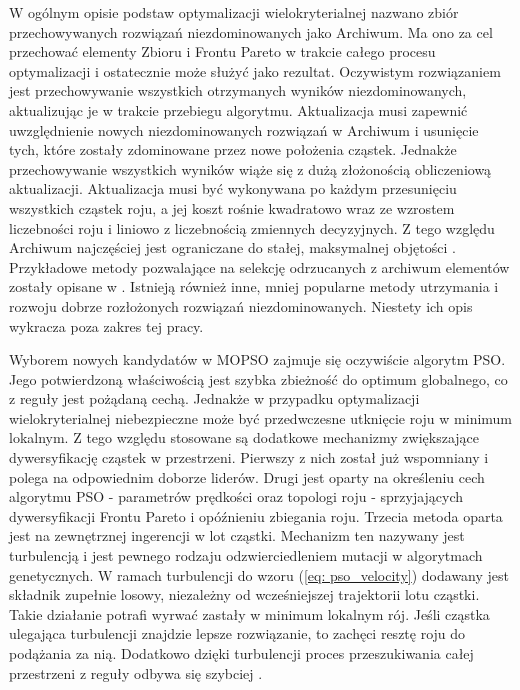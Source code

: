 W ogólnym opisie podstaw optymalizacji wielokryterialnej nazwano zbiór przechowywanych rozwiązań niezdominowanych jako Archiwum. Ma ono za cel przechować elementy Zbioru i Frontu Pareto w trakcie całego procesu optymalizacji i ostatecznie może służyć jako rezultat. Oczywistym rozwiązaniem jest przechowywanie wszystkich otrzymanych wyników niezdominowanych, aktualizując je w trakcie przebiegu algorytmu. Aktualizacja musi zapewnić uwzględnienie nowych niezdominowanych rozwiązań w Archiwum i usunięcie tych, które zostały zdominowane przez nowe położenia cząstek. Jednakże przechowywanie wszystkich wyników wiąże się z dużą złożonością obliczeniową aktualizacji. Aktualizacja musi być wykonywana po każdym przesunięciu wszystkich cząstek roju, a jej koszt rośnie kwadratowo wraz ze wzrostem liczebności roju i liniowo z liczebnością zmiennych decyzyjnych. Z tego względu Archiwum najczęściej jest ograniczane do stałej, maksymalnej objętości \parencite{Coello2007}. Przykładowe metody pozwalające na selekcję odrzucanych z archiwum elementów zostały opisane w \parencite{Zitzler1999,Knowles2000}. Istnieją również inne, mniej popularne metody utrzymania i rozwoju dobrze rozłożonych rozwiązań niezdominowanych. Niestety ich opis wykracza poza zakres tej pracy.

Wyborem nowych kandydatów w MOPSO zajmuje się oczywiście algorytm PSO. Jego potwierdzoną właściwością jest szybka zbieżność do optimum globalnego, co z reguły jest pożądaną cechą. Jednakże w przypadku optymalizacji wielokryterialnej niebezpieczne może być przedwczesne utknięcie roju w minimum lokalnym. Z tego względu stosowane są dodatkowe mechanizmy zwiększające dywersyfikację cząstek w przestrzeni. Pierwszy z nich został już wspomniany i polega na odpowiednim doborze liderów. Drugi jest oparty na określeniu cech algorytmu PSO - parametrów prędkości oraz topologi roju - sprzyjających dywersyfikacji Frontu Pareto i opóźnieniu zbiegania roju. Trzecia metoda oparta jest na zewnętrznej ingerencji w lot cząstki. Mechanizm ten nazywany jest turbulencją \parencite{Fieldsend} i jest pewnego rodzaju odzwierciedleniem mutacji w algorytmach genetycznych. W ramach turbulencji do wzoru (\ref{eq: pso_velocity}) dodawany jest składnik zupełnie losowy, niezależny od wcześniejszej trajektorii lotu cząstki. Takie działanie potrafi wyrwać zastały w minimum lokalnym rój. Jeśli cząstka ulegająca turbulencji znajdzie lepsze rozwiązanie, to zachęci resztę roju do podążania za nią. Dodatkowo dzięki turbulencji  proces przeszukiwania całej przestrzeni z reguły odbywa się szybciej \parencite{Stacey2003}.

